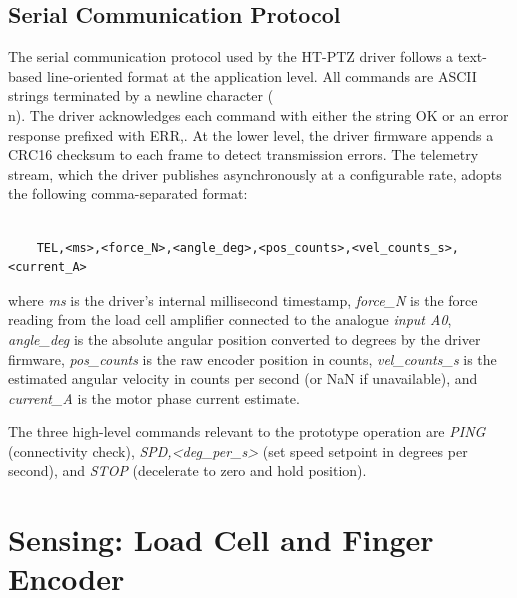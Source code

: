 \subsection{Serial Communication Protocol}
The serial communication protocol used by the HT-PTZ driver follows a text-based line-oriented format at the application level. All commands are ASCII strings terminated by a newline character (\\n). The driver acknowledges each command with either the string OK or an error response prefixed with ERR,. At the lower level, the driver firmware appends a CRC16 checksum to each frame to detect transmission errors.
The telemetry stream, which the driver publishes asynchronously at a configurable rate, adopts the following comma-separated format:

\begin{verbatim}

    TEL,<ms>,<force_N>,<angle_deg>,<pos_counts>,<vel_counts_s>,<current_A>

\end{verbatim}

where \textit{ms} is the driver's internal millisecond timestamp, \textit{force\_N} is the force reading from the load cell amplifier connected to the analogue \textit{input A0}, \textit{angle\_deg} is the absolute angular position converted to degrees by the driver firmware, \textit{pos\_counts} is the raw encoder position in counts, \textit{vel\_counts\_s} is the estimated angular velocity in counts per second (or NaN if unavailable), and \textit{current\_A} is the motor phase current estimate. 

The three high-level commands relevant to the prototype operation are \textit{PING} (connectivity check), \textit{SPD,<deg\_per\_s>} (set speed setpoint in degrees per second), and \textit{STOP} (decelerate to zero and hold position).

\section{Sensing: Load Cell and Finger Encoder}
